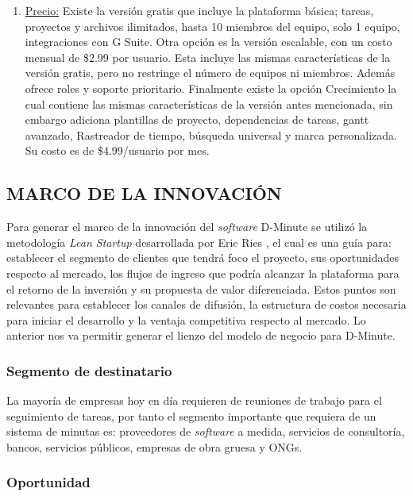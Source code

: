 \begin{enumerate}[1.]
\begin{enumerate}[a]
	    \item \underline{Precio:} Existe la versión gratis que incluye la plataforma básica; tareas, proyectos y archivos ilimitados, hasta 10 miembros del equipo, solo 1 equipo, integraciones con G Suite. Otra opción es la versión escalable, con un costo mensual de \$2.99 por usuario. Esta incluye las mismas características de la versión gratis, pero no restringe el número de equipos ni miembros. Además ofrece roles y soporte prioritario. Finalmente existe la opción Crecimiento la cual contiene las mismas características de la versión antes mencionada, sin embargo adiciona plantillas de proyecto, dependencias de tareas, gantt avanzado, Rastreador de tiempo, búsqueda universal y marca personalizada. Su costo es de \$4.99/usuario por mes.
    \end{enumerate}	      
\end{enumerate}

\subsection{MARCO DE LA INNOVACIÓN}

Para generar el marco de la innovación del \textit{software} D-Minute se utilizó la metodología \textit{Lean Startup} desarrollada por Eric Ries , el cual es una guía para: establecer el segmento de clientes que tendrá foco el proyecto, sus oportunidades respecto al mercado, los flujos de ingreso que podría alcanzar la plataforma para el retorno de la inversión y su propuesta de valor diferenciada. Estos puntos son relevantes para establecer los canales de difusión, la estructura de costos necesaria para iniciar el desarrollo y la ventaja competitiva respecto al mercado. Lo anterior nos va permitir generar el lienzo del modelo de negocio para D-Minute.

\subsubsection{Segmento de destinatario}

La mayoría de empresas hoy en día requieren de reuniones de trabajo para el seguimiento de tareas, por tanto el segmento importante que requiera de un sistema de minutas es: proveedores de \textit{software} a medida, servicios de consultoría, bancos, servicios públicos, empresas de obra gruesa y ONGs.

\subsubsection{Oportunidad}

